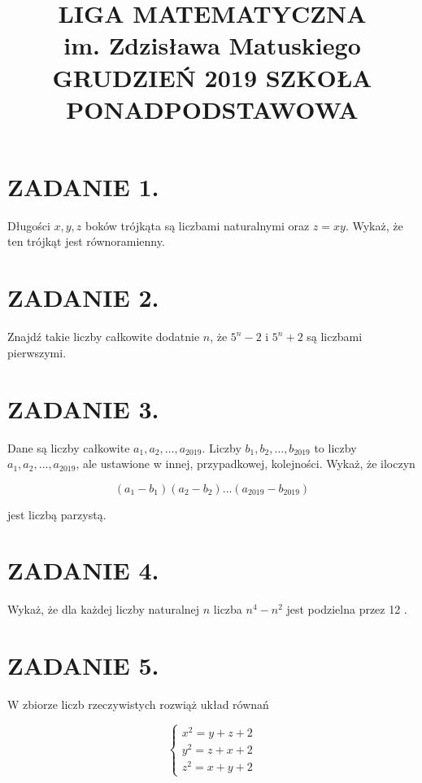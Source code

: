 \documentclass[10pt]{article}
\title{LIGA MATEMATYCZNA \\
 im. Zdzisława Matuskiego GRUDZIEŃ 2019 SZKOŁA PONADPODSTAWOWA }
\author{}
\date{}
\begin{document}
\maketitle
\section*{ZADANIE 1.}
Długości \(x, y, z\) boków trójkąta są liczbami naturalnymi oraz \(z=x y\). Wykaż, że ten trójkąt jest równoramienny.

\section*{ZADANIE 2.}
Znajdź takie liczby całkowite dodatnie \(n\), że \(5^{n}-2\) i \(5^{n}+2\) są liczbami pierwszymi.

\section*{ZADANIE 3.}
Dane są liczby całkowite \(a_{1}, a_{2}, \ldots, a_{2019}\). Liczby \(b_{1}, b_{2}, \ldots, b_{2019}\) to liczby \(a_{1}, a_{2}, \ldots, a_{2019}\), ale ustawione w innej, przypadkowej, kolejności. Wykaż, że iloczyn

\[
\left(a_{1}-b_{1}\right)\left(a_{2}-b_{2}\right) \ldots\left(a_{2019}-b_{2019}\right)
\]

jest liczbą parzystą.

\section*{ZADANIE 4.}
Wykaż, że dla każdej liczby naturalnej \(n\) liczba \(n^{4}-n^{2}\) jest podzielna przez 12 .

\section*{ZADANIE 5.}
W zbiorze liczb rzeczywistych rozwiąż układ równań

\[
\left\{\begin{array}{l}
x^{2}=y+z+2 \\
y^{2}=z+x+2 \\
z^{2}=x+y+2
\end{array}\right.
\]
\end{document}
